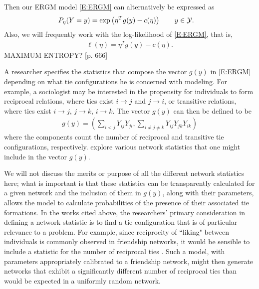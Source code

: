 Then our ERGM model \eqref{E:ERGM} can alternatively be expressed as 
\begin{align*}
	P_{\eta}(Y=y) &= \exp \left (\eta^T g(y) - c(\eta) \right ) \qquad y \in {\mathcal Y}.
\end{align*}
Also, we will frequently work with the log-likelihood of \eqref{E:ERGM}, that is,
\begin{align}
	\ell( \eta ) = \eta^T g(y) - c( \eta). \label{E:loglike}
\end{align}
MAXIMUM ENTROPY?  \citep{Geyer:1992}[p. 666]

A researcher specifies the statistics that compose the vector $g(y)$ in \eqref{E:ERGM} depending on what tie configurations he is concerned with modeling.  For example, a sociologist may be interested in the propensity for individuals to form reciprocal relations, where ties exist $i \to j$ and $j \to i$, or transitive relations, where ties exist $i \to j$, $j \to k$, $i \to k$.  The vector $g(y)$ can then be defined to be 
\begin{align*}
g(y) = \left ( \sum_{i<j} Y_{ij}Y_{ji}, \sum_{i \neq j \neq k} Y_{ij}Y_{jk}Y_{ik} \right )  
\end{align*}
where the components count the number of reciprocal and transitive tie configurations, respectively.  \citet{Wasserman:1996, Pattison:1999, logit, introp*} explore various network statistics that one might include in the vector $g(y)$.  

We will not discuss the merits or purpose of all the different network statistics here; what is important is that these statistics can be transparently calculated for a given network and the inclusion of them in $g(y)$, along with their parameters, allows the model to calculate probabilities of the presence of their associated tie formations.  In the works cited above, the researchers' primary consideration in defining a network statistic is to find a tie configuration that is of particular relevance to a problem.  For example, since reciprocity of ``liking" between individuals is commonly observed in friendship networks, it would be sensible to include a statistic for the number of reciprocal ties \citep{Holland:1981}.  Such a model, with parameters appropriately calibrated to a friendship network, might then generate networks that exhibit a significantly different number of reciprocal ties than would be expected in a uniformly random network.


